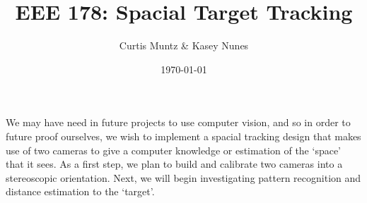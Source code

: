 \documentclass{article}
\title{EEE 178: Spacial Target Tracking}
\date{\today}
\author{Curtis Muntz \& Kasey Nunes}
\begin{document}
\maketitle
We may have need in future projects to use computer vision, and so in order to future proof ourselves, we wish to implement a spacial tracking design that makes use of two cameras to give a computer knowledge or estimation of the `space' that it sees. As a first step, we plan to build and calibrate two cameras into a stereoscopic orientation. Next, we will begin investigating pattern recognition and distance estimation to the `target'.
\end{document}
